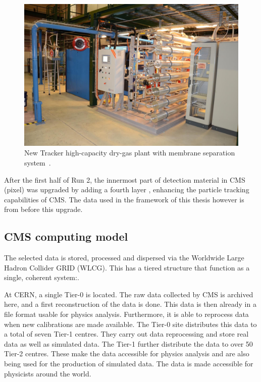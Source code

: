\begin{figure}[htbp]
\begin{minipage}[t]{0.59\textwidth}
		\includegraphics[width=\textwidth]{2_ExperimentalSetup/Figures/plant}
		\caption{New Tracker high-capacity dry-gas plant with membrane separation system~\cite{Pralavorio:2024977}.}
		\label{fig:TrackLS1}
	\end{minipage}
	
\end{figure}


After the first half of Run 2, the innermost part of detection material in CMS (pixel) was upgraded by adding a fourth layer , enhancing the particle tracking capabilities of CMS. The data used in the framework of this thesis however is from before this upgrade. 


\subsection{CMS computing model}
\label{sec:Computing}
The selected data is stored, processed and dispersed via the Worldwide Large Hadron Collider GRID (WLCG)\cite{Grandi:814248,Eck:840543}. This has a tiered structure that function as a single, coherent system:. 

At CERN, a single Tier-0 is located. The raw data collected by CMS is archived here, and a first reconstruction of the data is done. This data is then already in a file format usable for physics analysis. Furthermore, it is able to reprocess data when new calibrations are made available. The Tier-0 site distributes this data to a total of seven Tier-1 centres. They carry out data reprocessing and store real data as well as simulated  data. The Tier-1 further distribute the data to over 50 Tier-2 centres. These make the data accessible for physics analysis and are also being used for the production of simulated data. The data is made accessible for  physicists around the world. 
